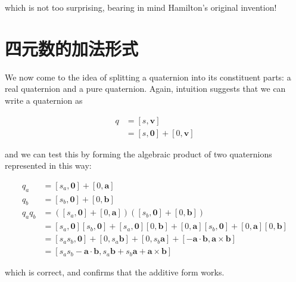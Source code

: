 which is not too surprising, bearing in mind Hamilton's original invention!

\section{四元数的加法形式}
We now come to the idea of splitting a quaternion into its constituent parts: a real quaternion and a pure quaternion. Again, intuition suggests that we can write a quaternion as

$$
    \begin{aligned}
        q & =[s, \mathbf{v}]                 \\
          & =[s, \mathbf{0}]+[0, \mathbf{v}]
    \end{aligned}
$$

and we can test this by forming the algebraic product of two quaternions represented in this way:

$$
    \begin{aligned}
        q_{a}       & =\left[s_{a}, \mathbf{0}\right]+[0, \mathbf{a}]                                                                                                                                          \\
        q_{b}       & =\left[s_{b}, \mathbf{0}\right]+[0, \mathbf{b}]                                                                                                                                          \\
        q_{a} q_{b} & =\left(\left[s_{a}, \mathbf{0}\right]+[0, \mathbf{a}]\right)\left(\left[s_{b}, \mathbf{0}\right]+[0, \mathbf{b}]\right)                                                                  \\
                    & =\left[s_{a}, \mathbf{0}\right]\left[s_{b}, \mathbf{0}\right]+\left[s_{a}, \mathbf{0}\right][0, \mathbf{b}]+[0, \mathbf{a}]\left[s_{b}, \mathbf{0}\right]+[0, \mathbf{a}][0, \mathbf{b}] \\
                    & =\left[s_{a} s_{b}, \mathbf{0}\right]+\left[0, s_{a} \mathbf{b}\right]+\left[0, s_{b} \mathbf{a}\right]+[-\mathbf{a} \cdot \mathbf{b}, \mathbf{a} \times \mathbf{b}]                     \\
                    & =\left[s_{a} s_{b}-\mathbf{a} \cdot \mathbf{b}, s_{a} \mathbf{b}+s_{b} \mathbf{a}+\mathbf{a} \times \mathbf{b}\right]
    \end{aligned}
$$

which is correct, and confirms that the additive form works.

